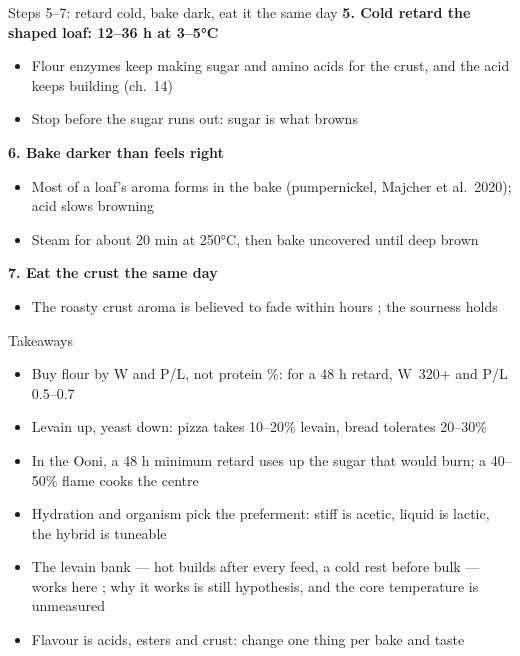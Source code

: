 \documentclass[aspectratio=169,11pt]{beamer}
\begin{document}
\begin{frame}{Steps 5--7: retard cold, bake dark, eat it the same day}
  \textbf{5. Cold retard the shaped loaf: 12--36 h at 3--5°C}
  \begin{itemize}\small
    \item Flour enzymes keep making sugar and amino acids for the crust, and the acid keeps building (ch.~14)
    \item Stop before the sugar runs out: sugar is what browns
  \end{itemize}
  \textbf{6. Bake darker than feels right}
  \begin{itemize}\small
    \item Most of a loaf's aroma forms in the bake (pumpernickel, Majcher et al.\ 2020); acid slows browning
    \item Steam for about 20 min at 250°C, then bake uncovered until deep brown \untested
  \end{itemize}
  \textbf{7. Eat the crust the same day}
  \begin{itemize}\small
    \item The roasty crust aroma is believed to fade within hours \untested; the sourness holds
  \end{itemize}
\end{frame}

\begin{frame}{Takeaways}
  \begin{itemize}
    \item Buy flour by W and P/L, not protein \%: for a 48 h retard, W~320+ and P/L 0.5--0.7
    \item Levain up, yeast down: pizza takes 10--20\% levain, bread tolerates 20--30\%
    \item In the Ooni, a 48 h minimum retard uses up the sugar that would burn; a 40--50\% flame cooks the centre
    \item Hydration and organism pick the preferment: stiff is acetic, liquid is lactic, the hybrid is tuneable
    \item The levain bank --- hot builds after every feed, a cold rest before bulk --- works here
      \ownresult; why it works is still hypothesis, and the core temperature is unmeasured
    \item Flavour is acids, esters and crust: change one thing per bake and taste
  \end{itemize}
\end{frame}
\end{document}
